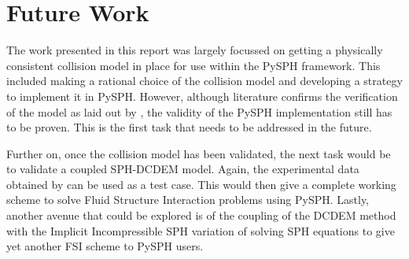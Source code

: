 \chapter{Future Work}

The work presented in this report was largely focussed on getting a physically consistent collision model in place for use within the PySPH framework. This included making a rational choice of the collision model and developing a strategy to implement it in PySPH. However, although literature confirms the verification of the model as laid out by \cite{canelas}, the validity of the PySPH implementation still has to be proven. This is the first task that needs to be addressed in the future.

Further on, once the collision model has been validated, the next task would be to validate a coupled SPH-DCDEM model. Again, the experimental data obtained by \cite{zhang} can be used as a test case. This would then give a complete working scheme to solve Fluid Structure Interaction problems using PySPH. Lastly, another avenue that could be explored is of the coupling of the DCDEM method with the Implicit Incompressible SPH variation of solving SPH equations to give yet another FSI scheme to PySPH users.